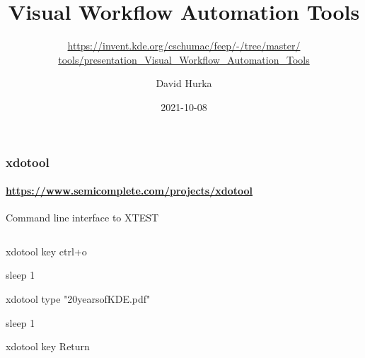 \documentclass{beamer}
\title{Visual Workflow Automation Tools}
\subtitle{\texorpdfstring{\tiny{\href{https://invent.kde.org/cschumac/feep/-/tree/master/tools/presentation_Visual_Workflow_Automation_Tools}{https://invent.kde.org/cschumac/feep/-/tree/master/\\tools/presentation\_Visual\_Workflow\_Automation\_Tools}}}{}}
\author{David Hurka}
\date{2021-10-08}
\begin{document}
    \begin{frame}
        \titlepage
    \end{frame}

    \begin{frame}
        \frametitle{xdotool}
        \framesubtitle{\url{https://www.semicomplete.com/projects/xdotool}}

        Command line interface to XTEST

        \begin{columns}

            \begin{column}{7cm}
                \begin{semiverbatim}
                    xdotool key ctrl+o

                    sleep 1

                    xdotool type "20yearsofKDE.pdf"

                    sleep 1

                    xdotool key Return
                \end{semiverbatim}
            \end{column}
        \end{columns}
    \end{frame}
\end{document}
